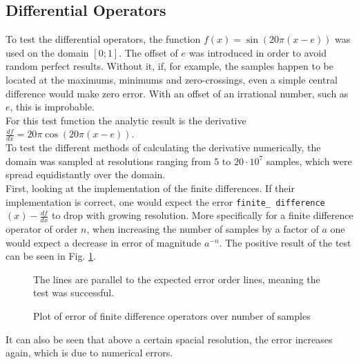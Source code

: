 \subsection{Differential Operators}
To test the differential operators, the function $f(x)=\sin(20\pi (x-e))$ was used on the domain $[0;1]$.
The offset of $e$ was introduced in order to avoid random perfect results.
Without it, if, for example, the samples happen to be located at the maximums, minimums and zero-crossings, even a simple central difference would make zero error.
With an offset of an irrational number, such as $e$, this is improbable.\\
For this test function the analytic result is the derivative $\frac{df}{dx}=20\pi\cos(20\pi (x-e))$.\\
To test the different methods of calculating the derivative numerically, the domain was sampled at resolutions ranging from $5$ to $20\cdot 10^7$ samples, which were spread equidistantly over the domain.\\
First, looking at the implementation of the finite differences.
If their implementation is correct, one would expect the error \texttt{finite\_ difference} $(x)-\frac{df}{dx}$ to drop with growing resolution.
More specifically for a finite difference operator of order $n$, when increasing the number of samples by a factor of $a$ one would expect a decrease in error of magnitude $a^{-n}$.
The positive result of the test can be seen in Fig. \ref{fig:derivative_error}.
\begin{figure}[!h]
    \caption{Plot of error of finite difference operators over number of samples}
    \label{fig:derivative_error}
    \small
    The lines are parallel to the expected error order lines, meaning the test was successful.
\end{figure}
It can also be seen that above a certain spacial resolution, the error increases again, which is due to numerical errors.
